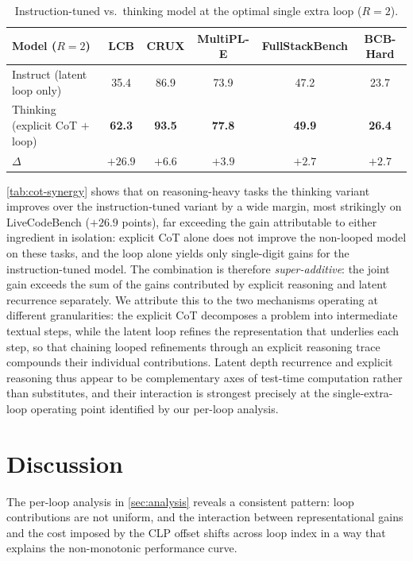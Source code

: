\documentclass{llmxive}
\providecommand{\loopcount}{R}
\begin{document}
\begin{table}[!htbp]
\centering
\begin{tabular}{lccccc}
\toprule
\textbf{Model ($\loopcount = 2$)} & LCB & CRUX & MultiPL-E & FullStackBench & BCB-Hard \\
\midrule
Instruct (latent loop only)        & 35.4 & 86.9 & 73.9 & 47.2 & 23.7 \\
Thinking (explicit CoT $+$ loop)   & \textbf{62.3} & \textbf{93.5} & \textbf{77.8} & \textbf{49.9} & \textbf{26.4} \\
\midrule
$\Delta$                           & $+26.9$ & $+6.6$ & $+3.9$ & $+2.7$ & $+2.7$ \\
\bottomrule
\end{tabular}
\caption{Instruction-tuned vs.\ thinking model at the optimal single extra loop
($\loopcount = 2$).}
\label{tab:cot-synergy}
\end{table}

\autoref{tab:cot-synergy} shows that on reasoning-heavy tasks the thinking
variant improves over the instruction-tuned variant by a wide margin, most
strikingly on LiveCodeBench ($+26.9$ points), far exceeding the gain
attributable to either ingredient in isolation: explicit CoT alone does not
improve the non-looped model on these tasks, and the loop alone yields only
single-digit gains for the instruction-tuned model.
The combination is therefore \emph{super-additive}: the joint gain exceeds the
sum of the gains contributed by explicit reasoning and latent recurrence
separately.
We attribute this to the two mechanisms operating at different granularities:
the explicit CoT decomposes a problem into intermediate textual steps, while the
latent loop refines the representation that underlies each step, so that
chaining looped refinements through an explicit reasoning trace compounds their
individual contributions.
Latent depth recurrence and explicit reasoning thus appear to be complementary
axes of test-time computation rather than substitutes, and their interaction is
strongest precisely at the single-extra-loop operating point identified by our
per-loop analysis.

\section{Discussion}
\label{sec:optimize_loop_strategy}

The per-loop analysis in \autoref{sec:analysis} reveals a consistent
pattern: loop contributions are not uniform, and the interaction between
representational gains and the cost imposed by the CLP offset shifts across
loop index in a way that explains the non-monotonic performance curve.
\end{document}
